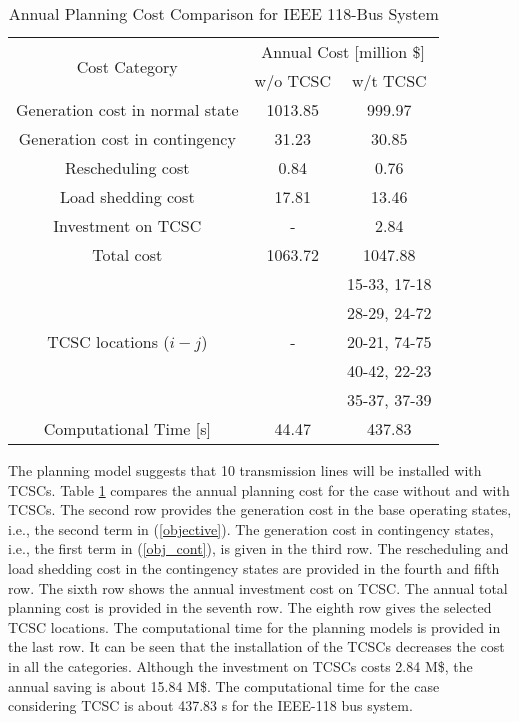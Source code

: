 \documentclass[journal]{IEEEtran}
\begin{document}
\begin{table}[!htb]
	\centering
	\caption{Annual Planning Cost Comparison for IEEE 118-Bus System}
	\label{annual_saving_118}
	\begin{tabular}{c c c}
		\hline
		\multirow{2}{*}{Cost Category}&\multicolumn{2}{c}{Annual Cost [million \$]}     \\
		\cline{2-3}
		&w/o TCSC&w/t TCSC      \\
		\hline
		Generation cost in normal state&1013.85&999.97   \\
		\hline
		Generation cost in contingency&31.23&30.85     \\
		\hline
		Rescheduling cost&0.84&0.76           \\
		\hline
		Load shedding cost&17.81&13.46      \\
		\hline
		Investment on TCSC&-&2.84     \\
		\hline
		Total cost&1063.72&1047.88      \\
		\hline
		&&15-33, 17-18  \\
		&&28-29, 24-72   \\
		TCSC locations ($i-j$)&-&20-21, 74-75  \\
		&&40-42, 22-23  \\
		&&35-37, 37-39  \\
		\hline
		Computational Time [s]&44.47 &437.83  \\
		\hline
	\end{tabular}
\end{table}

The planning model suggests that 10 transmission lines will be installed with TCSCs. Table \ref{annual_saving_118} compares the annual planning cost for the case without and with TCSCs. The second row provides the generation cost in the base operating states, i.e., the second term in (\ref{objective}). The generation cost in contingency states, i.e., the first term in (\ref{obj_cont}), is given in the third row. The rescheduling and load shedding cost in the contingency states are provided in the fourth and fifth row. The sixth row shows the annual investment cost on TCSC. The annual total planning cost is provided in the seventh row. The eighth row gives the selected TCSC locations. The computational time for the planning models is provided in the last row. It can be seen that the installation of the TCSCs decreases the cost in all the categories. Although the investment on TCSCs costs 2.84 M\$, the annual saving is about 15.84 M\$. The computational time for the case considering TCSC is about 437.83 s for the IEEE-118 bus system.  
\end{document}
